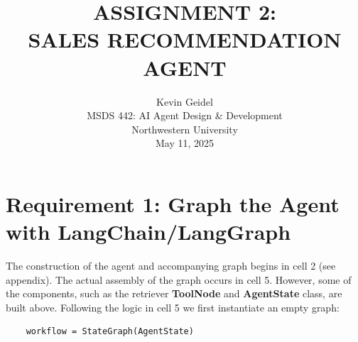 \documentclass[11pt,letterpaper]{article}
\begin{document}
\selectfont
{}
\doublespacing
\setlength{\droptitle}{1in} 

\title{\large{ASSIGNMENT 2: \\ SALES RECOMMENDATION AGENT \\\vspace{1.2in}}}

\author{
Kevin Geidel \\
MSDS 442: AI Agent Design \& Development \\
Northwestern University \\
May 11, 2025 \\
}

\date{}
\maketitle
\thispagestyle{empty}	
\clearpage
\setcounter{page}{1}


\section*{Requirement 1: Graph the Agent with LangChain/LangGraph}
    \tab The construction of the agent and accompanying graph begins in cell 2 (see appendix). 
    The actual assembly of the graph occurs in cell 5. However, some of the components, such as the retriever \textbf{ToolNode} and \textbf{AgentState} class,
    are built above. Following the logic in cell 5 we first instantiate an empty graph:

    \begin{verbatim}
    workflow = StateGraph(AgentState)
    \end{verbatim}
\end{document}
